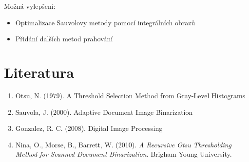 \documentclass[12pt,a4paper]{article}
\begin{document}
Možná vylepšení:
\begin{itemize}
\item Optimalizace Sauvolovy metody pomocí integrálních obrazů
\item Přidání dalších metod prahování
\end{itemize}

\section*{Literatura}
\begin{enumerate}
\item Otsu, N. (1979). A Threshold Selection Method from Gray-Level Histograms
\item Sauvola, J. (2000). Adaptive Document Image Binarization
\item Gonzalez, R. C. (2008). Digital Image Processing
\item Nina, O., Morse, B., Barrett, W. (2010). \textit{A Recursive Otsu Thresholding Method for Scanned Document Binarization}. Brigham Young University.
\end{enumerate}
\end{document}
